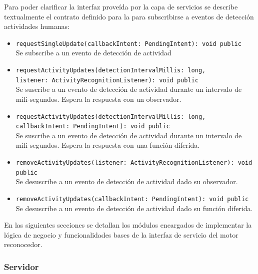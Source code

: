 Para poder clarificar la interfaz proveída por la capa de servicios
se describe textualmente el contrato definido para la 
para subscribirse a eventos de detección actividades humanas:
\begin{itemize}
\item \texttt{\footnotesize{}requestSingleUpdate(callbackIntent: PendingIntent): void
public} \\
Se subscribe a un evento de detección de actividad 
\item \texttt{\footnotesize{}requestActivityUpdates(detectionIntervalMillis: long,
}~\\
\texttt{\footnotesize{}listener: ActivityRecognitionListener): void
public}\\
Se suscribe a un evento de detección de actividad durante un intervalo
de mili-segundos. Espera la respuesta con un observador.
\item \texttt{\footnotesize{}requestActivityUpdates(detectionIntervalMillis: long,
}~\\
\texttt{\footnotesize{}callbackIntent: PendingIntent): void public}
\\
Se suscribe a un evento de detección de actividad durante un intervalo
de mili-segundos. Espera la respuesta con una función diferida.
\item \texttt{\footnotesize{}removeActivityUpdates(listener: ActivityRecognitionListener): void
public} \\
Se desuscribe a un evento de detección de actividad dado su observador.
\item \texttt{\footnotesize{}removeActivityUpdates(callbackIntent: PendingIntent): void
public}\\
Se desuscribe a un evento de detección de actividad dado su función
diferida.
\end{itemize}
En las siguientes secciones se detallan los módulos encargados de
implementar la lógica de negocio y funcionalidades bases de la interfaz
de servicio del motor reconocedor.

\subsubsection{Servidor}

